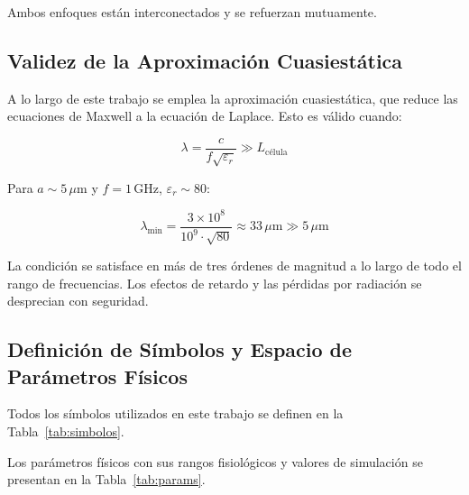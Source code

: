 \documentclass[12pt]{article}
\begin{document}
Ambos enfoques est\'an interconectados y se refuerzan mutuamente.

\subsection{Validez de la Aproximaci\'on Cuasiestática}

A lo largo de este trabajo se emplea la aproximaci\'on cuasiestática, que reduce las ecuaciones
de Maxwell a la ecuaci\'on de Laplace. Esto es v\'alido cuando:

\begin{equation}
\lambda = \frac{c}{f\sqrt{\varepsilon_r}} \gg L_{\text{c\'elula}}
\end{equation}

Para $a \sim 5\,\mu\text{m}$ y $f = 1\,\text{GHz}$, $\varepsilon_r \sim 80$:

\begin{equation}
\lambda_{\min} = \frac{3\times10^8}{10^9\cdot\sqrt{80}} \approx 33\,\mu\text{m}
\gg 5\,\mu\text{m}
\end{equation}

La condici\'on se satisface en m\'as de tres \'ordenes de magnitud a lo largo de todo el rango de
frecuencias. Los efectos de retardo y las p\'erdidas por radiaci\'on se desprecian con seguridad.

\subsection{Definici\'on de S\'imbolos y Espacio de Par\'ametros F\'isicos}

Todos los s\'imbolos utilizados en este trabajo se definen en la Tabla~\ref{tab:simbolos}.

Los par\'ametros f\'isicos con sus rangos fisiol\'ogicos y valores de simulaci\'on se presentan en
la Tabla~\ref{tab:params}.
\end{document}
